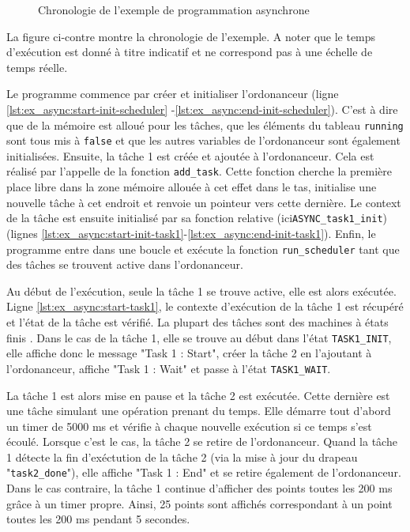 \begin{minipage}{0.95\textwidth}
\begin{wrapfigure}{L}{0.35\textwidth}
\vspace{0.5cm}

\caption{Chronologie de l'exemple de programmation asynchrone}
\end{wrapfigure}

La figure ci-contre montre la chronologie de l'exemple. A noter que le temps
d'exécution est donné à titre indicatif et ne correspond pas à une échelle de temps réelle.

\vspace{0.5cm}

Le programme commence par créer et initialiser l'ordonanceur (ligne \ref{lst:ex_async:start-init-scheduler}
-\ref{lst:ex_async:end-init-scheduler}). C'est à dire que de la mémoire est alloué pour les tâches, que les
éléments du tableau \texttt{running} sont tous mis à \texttt{false} et que les autres variables de
l'ordonanceur sont également initialisées.
Ensuite, la tâche 1 est créée et ajoutée à l'ordonanceur. Cela est réalisé par l'appelle de la fonction
\texttt{add\_task}. Cette fonction cherche la première place libre dans la zone mémoire allouée à cet effet
dans le tas, initialise une nouvelle tâche à cet endroit et renvoie un pointeur vers cette dernière.
Le context de la tâche est ensuite initialisé par sa fonction relative (ici\newline \texttt{ASYNC\_task1\_init})
(lignes \ref{lst:ex_async:start-init-task1}-\ref{lst:ex_async:end-init-task1}).
Enfin, le programme entre dans une boucle et exécute la fonction \texttt{run\_scheduler} tant que
des tâches se trouvent active dans l'ordonanceur.

Au début de l'exécution, seule la tâche 1 se trouve active, elle est alors exécutée. Ligne
\ref{lst:ex_async:start-task1}, le contexte d'exécution de la tâche 1 est récupéré et l'état de la tâche
est vérifié. La plupart des tâches sont des machines à états finis \footnotemark. Dans le cas de la tâche
1, elle se trouve au début dans l'état \texttt{TASK1\_INIT}, elle affiche donc le message "Task 1 : Start",
créer la tâche 2 en l'ajoutant à l'ordonanceur, affiche "Task 1 : Wait" et passe à l'état \texttt{TASK1\_WAIT}.

La tâche 1 est alors mise en pause et la tâche 2 est exécutée. Cette dernière est une tâche simulant
une opération prenant du temps. Elle démarre tout d'abord un timer de 5000 ms et vérifie à chaque nouvelle
exécution si ce temps s'est écoulé. Lorsque c'est le cas, la tâche 2 se retire de l'ordonanceur. Quand la
tâche 1 détecte la fin d'exéctution de la tâche 2 (via la mise à jour du drapeau "\texttt{task2\_done}"), elle
affiche "Task 1 : End" et se retire également de l'ordonanceur. Dans le cas contraire, la tâche 1 continue
d'afficher des points toutes les 200 ms grâce à un timer propre. Ainsi, 25 points sont affichés correspondant
à un point toutes les 200 ms pendant 5 secondes. 

\end{minipage}

